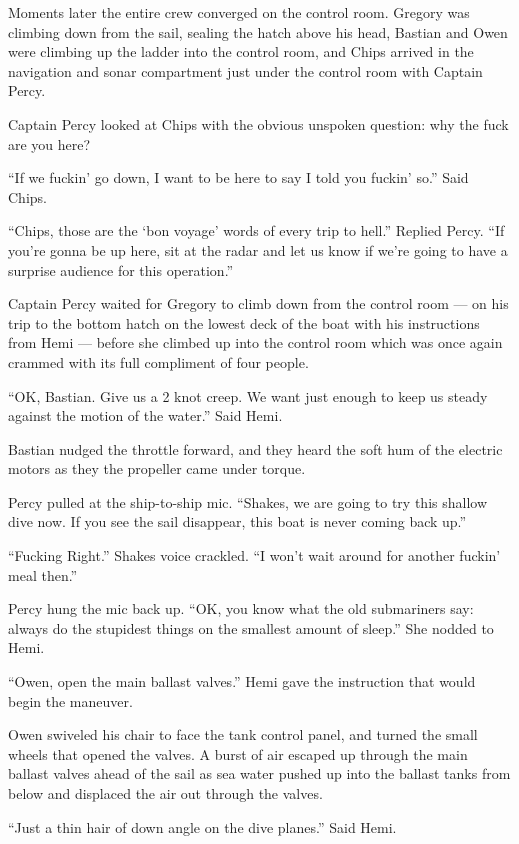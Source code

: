 \documentclass[]{scrbook}
\begin{document}
Moments later the entire crew converged on the control room. Gregory was
climbing down from the sail, sealing the hatch above his head, Bastian
and Owen were climbing up the ladder into the control room, and Chips
arrived in the navigation and sonar compartment just under the control
room with Captain Percy.

Captain Percy looked at Chips with the obvious unspoken question: why
the fuck are you here?

``If we fuckin' go down, I want to be here to say I told you fuckin'
so.'' Said Chips.

``Chips, those are the `bon voyage' words of every trip to hell.''
Replied Percy. ``If you're gonna be up here, sit at the radar and let us
know if we're going to have a surprise audience for this operation.''

Captain Percy waited for Gregory to climb down from the control room ---
on his trip to the bottom hatch on the lowest deck of the boat with his
instructions from Hemi --- before she climbed up into the control room
which was once again crammed with its full compliment of four people.

``OK, Bastian. Give us a 2 knot creep. We want just enough to keep us
steady against the motion of the water.'' Said Hemi.

Bastian nudged the throttle forward, and they heard the soft hum of the
electric motors as they the propeller came under torque.

Percy pulled at the ship-to-ship mic. ``Shakes, we are going to try this
shallow dive now. If you see the sail disappear, this boat is never
coming back up.''

``Fucking Right.'' Shakes voice crackled. ``I won't wait around for
another fuckin' meal then.''

Percy hung the mic back up. ``OK, you know what the old submariners say:
always do the stupidest things on the smallest amount of sleep.'' She
nodded to Hemi.

``Owen, open the main ballast valves.'' Hemi gave the instruction that
would begin the maneuver.

Owen swiveled his chair to face the tank control panel, and turned the
small wheels that opened the valves. A burst of air escaped up through
the main ballast valves ahead of the sail as sea water pushed up into
the ballast tanks from below and displaced the air out through the
valves.

``Just a thin hair of down angle on the dive planes.'' Said Hemi.
\end{document}
